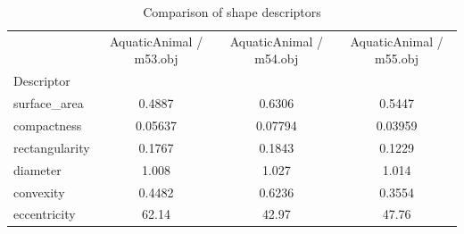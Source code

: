 \begin{table}
\caption{Comparison of shape descriptors}
\label{tab:shape-comparison}
\begin{tabular}{l|ccc}
\toprule
 & AquaticAnimal / m53.obj & AquaticAnimal / m54.obj & AquaticAnimal / m55.obj \\
Descriptor &  &  &  \\
\midrule
surface\_area & 0.4887 & 0.6306 & 0.5447 \\
compactness & 0.05637 & 0.07794 & 0.03959 \\
rectangularity & 0.1767 & 0.1843 & 0.1229 \\
diameter & 1.008 & 1.027 & 1.014 \\
convexity & 0.4482 & 0.6236 & 0.3554 \\
eccentricity & 62.14 & 42.97 & 47.76 \\
\bottomrule
\end{tabular}
\end{table}
